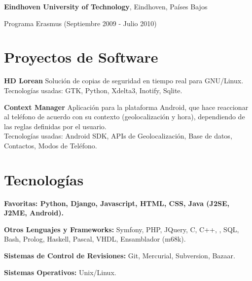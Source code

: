 \documentclass[margin,line]{resume}
\begin{document}
\begin{resume}
{\bf Eindhoven University of Technology}, Eindhoven, Países Bajos\\
\vspace*{-.1in}
\begin{list1}
\item[] Programa Erasmus (Septiembre 2009 - Julio 2010)
\end{list1}

\section{\sc Proyectos de Software } 
\begin{list1}
\item[] {\bf HD Lorean}
Solución de copias de seguridad en tiempo real para GNU/Linux.\\
Tecnologías usadas: GTK, Python, Xdelta3, Inotify, Sqlite.\\

\item[] {\bf Context Manager}
Aplicación para la plataforma Android, que hace reaccionar al teléfono 
de acuerdo con su contexto (geolocalización y hora), dependiendo de las reglas definidas por el usuario.\\
Tecnologías usadas: Android SDK, APIs de Geolocalización, Base de datos,
Contactos, Modos de Teléfono.
\end{list1}

\section{\sc Tecnologías} 
\begin{list1}
\item[]{\bf Favoritas: Python, Django, Javascript, HTML, CSS, Java (J2SE, J2ME, Android).} 
\item[]{\bf Otros Lenguajes y Frameworks:} Symfony, PHP, JQuery, C, C++, , SQL, Bash, Prolog, Haskell, Pascal, VHDL, Ensamblador (m68k).
\item[]{\bf Sistemas de Control de Revisiones:} Git, Mercurial, Subversion, Bazaar.
\item[]{\bf Sistemas Operativos:} Unix/Linux.
\end{list1}


\end{resume}
\end{document}
